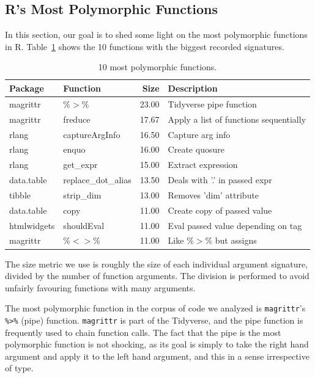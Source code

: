 \documentclass[acmsmall,10pt,review,anonymous]{acmart}\settopmatter{printfolios=true,printccs=false,printacmref=false}
\begin{document}
%
%
%
%
\subsection{R's Most Polymorphic Functions}

In this section, our goal is to shed some light on the most polymorphic functions in R.
Table~\ref{tab:bigpolyfuns} shows the 10 functions with the biggest recorded signatures.

\begin{table}[ht]
\label{tab:bigpolyfuns}
\centering
\begin{tabular}{llrl}
  \hline
Package & Function & Size & Description \\ 
  \hline
magrittr & \%$>$\% & 23.00 & Tidyverse pipe function \\ 
  magrittr & freduce & 17.67 & Apply a list of functions sequentially \\ 
  rlang & captureArgInfo & 16.50 & Capture arg info \\ 
  rlang & enquo & 16.00 & Create quosure \\ 
  rlang & get\_expr & 15.00 & Extract expression \\ 
  data.table & replace\_dot\_alias & 13.50 & Deals with '.' in passed expr \\ 
  tibble & strip\_dim & 13.00 & Removes 'dim' attribute \\ 
  data.table & copy & 11.00 & Create copy of passed value \\ 
  htmlwidgets & shouldEval & 11.00 & Eval passed value depending on tag \\ 
  magrittr & \%$<$$>$\% & 11.00 & Like \%$>$\% but assigns \\ 
   \hline
\end{tabular}
\caption{10 most polymorphic functions.}
\end{table}

The size metric we use is roughly the size of each individual argument signature, divided by the number of function arguments.
The division is performed to avoid unfairly favouring functions with many arguments.




The most polymorphic function in the corpus of code we analyzed is {\tt magrittr}'s {\tt \%>\%} (pipe) function.
{\tt magrittr} is part of the Tidyverse, and the pipe function is frequently used to chain function calls.
The fact that the pipe is the most polymorphic function is not shocking, as its goal is simply to take the right hand argument and apply it to the left hand argument, and this in a sense irrespective of type.
\end{document}
